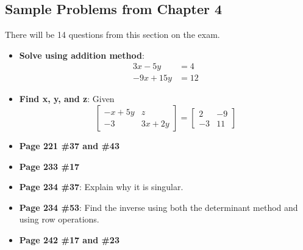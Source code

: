 \documentclass[14pt]{extarticle}
\begin{document}
\subsection*{Sample Problems from Chapter 4}
There will be 14 questions from this section on the exam.
\begin{itemize}
	\item \textbf{Solve using addition method}: 
	\begin{align*} 
		3x - 5y &= 4 \\ 
		-9x + 15y &= 12
	\end{align*}
	
	\item \textbf{Find x, y, and z}:
	Given
	$$\begin{bmatrix}
		-x + 5y & z \\
		-3 & 3x + 2y
	\end{bmatrix}
	= 
	\begin{bmatrix}
		2 & -9 \\
		-3 & 11
	\end{bmatrix}
	$$
	
	\item \textbf{Page 221 \#37 and \#43}
	\item \textbf{Page 233 \#17}
	\item \textbf{Page 234 \#37}: Explain why it is singular.
	\item \textbf{Page 234 \#53}: Find the inverse using both the determinant method and using row operations.
	\item \textbf{Page 242 \#17 and \#23}

\end{itemize}



\cleardoublepage
\end{document}
